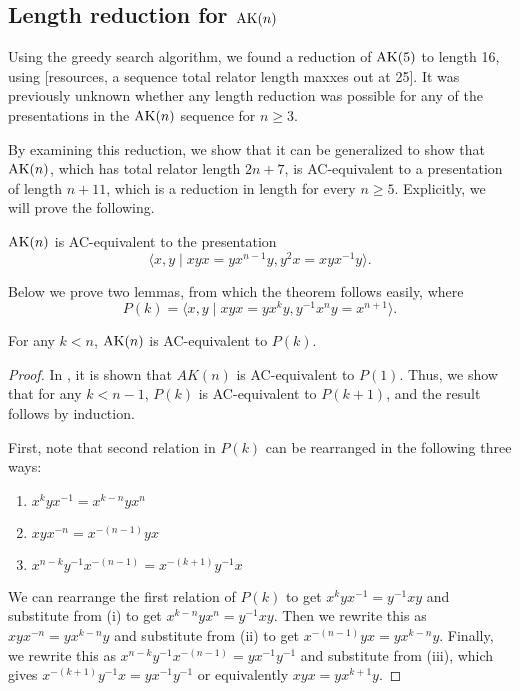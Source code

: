 \subsection{Length reduction for $\text{AK}(n)$}

Using the greedy search algorithm, we found a reduction of $\text{AK}(5)$ to length 16, using [resources, a sequence total relator length maxxes out at 25]. 
It was previously unknown whether any length reduction was possible for any of the presentations in the $\text{AK}(n)$ sequence for $n \geq 3$.

By examining this reduction, we show that it can be generalized to show that $\text{AK}(n)$, which has total relator length $2n+7$, is AC-equivalent to a presentation of length $n+11$, which is a reduction in length for every $n \geq 5$.
Explicitly, we will prove the following.

\begin{theorem}
    $\text{AK}(n)$ is AC-equivalent to the presentation
    \[
    \langle x,y \mid xyx=yx^{n-1}y, y^2x=xyx^{-1}y \rangle.
    \]
\end{theorem}

\medskip Below we prove two lemmas, from which the theorem follows easily, where
\[
P(k) = \langle x,y \mid xyx=yx^k y, y^{-1}x^n y = x^{n+1}\rangle.
\]

\begin{lemma}
    For any $k<n$, $\text{AK}(n)$ is AC-equivalent to $P(k)$.
\end{lemma}

\begin{proof}
    In \cite{MMS}, it is shown that $AK(n)$ is AC-equivalent to $P(1)$. Thus, we show that for any $k<n-1$, $P(k)$ is AC-equivalent to $P(k+1)$, and the result follows by induction. 
    
    First, note that second relation in $P(k)$ can be rearranged in the following three ways: 
    \begin{enumerate}[label=(\roman*)]
        \item $x^kyx^{-1}=x^{k-n}yx^n$
        \item $xyx^{-n}=x^{-(n-1)}yx$
        \item $x^{n-k}y^{-1}x^{-(n-1)}=x^{-(k+1)}y^{-1}x$
    \end{enumerate}
    
    We can rearrange the first relation of $P(k)$ to get $x^k y x^{-1}=y^{-1}xy$ and substitute from (i) to get $x^{k-n} y x^n = y^{-1}xy$. Then we rewrite this as $xyx^{-n}=yx^{k-n}y$ and substitute from (ii) to get $ x^{-(n-1)}yx= yx^{k-n}y$. Finally, we rewrite this as $x^{n-k}y^{-1}x^{-(n-1)}=yx^{-1}y^{-1}$ and substitute from (iii), which gives $x^{-(k+1)}y^{-1}x=yx^{-1}y^{-1}$ or equivalently $xyx=yx^{k+1}y$.
\end{proof}

